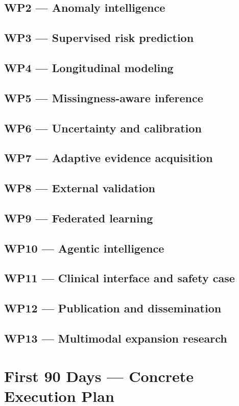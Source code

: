 \documentclass[11pt,journal,onecolumn,draftclsnofoot]{IEEEtran}
\begin{document}
\subsection{WP2 --- Anomaly intelligence}
\subsection{WP3 --- Supervised risk prediction}
\subsection{WP4 --- Longitudinal modeling}
\subsection{WP5 --- Missingness-aware inference}
\subsection{WP6 --- Uncertainty and calibration}
\subsection{WP7 --- Adaptive evidence acquisition}
\subsection{WP8 --- External validation}
\subsection{WP9 --- Federated learning}
\subsection{WP10 --- Agentic intelligence}
\subsection{WP11 --- Clinical interface and safety case}
\subsection{WP12 --- Publication and dissemination}
\subsection{WP13 --- Multimodal expansion research}

\section{First 90 Days --- Concrete Execution Plan}
\end{document}
